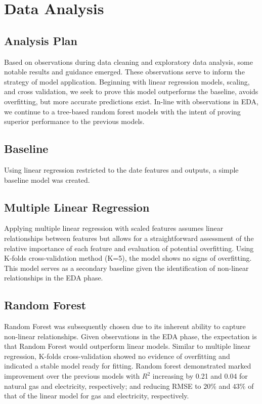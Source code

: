 \documentclass[11pt,a4paper]{article}
\begin{document}
\section{Data Analysis}

\subsection{Analysis Plan}
Based on observations during data cleaning and exploratory data analysis, some notable results and guidance emerged. These observations serve to inform the strategy of model application. Beginning with linear regression models, scaling, and cross validation, we seek to prove this model outperforms the baseline, avoids overfitting, but more accurate predictions exist. In-line with observations in EDA, we continue to a tree-based random forest models with the intent of proving superior performance to the previous models.  

\subsection{Baseline}
Using linear regression restricted to the date features and outputs, a simple baseline model was created.
\subsection{Multiple Linear Regression}
Applying multiple linear regression with scaled features assumes linear relationships between features but allows for a straightforward assessment of the relative importance of each feature and evaluation of potential overfitting. Using K-folds cross-validation method (K=5), the model shows no signs of overfitting. This model serves as a secondary baseline given the identification of non-linear relationships in the EDA phase. 

\subsection{Random Forest}
Random Forest was subsequently chosen due to its inherent ability to capture non-linear relationships. Given observations in the EDA phase, the expectation is that Random Forest would outperform linear models. Similar to multiple linear regression, K-folds cross-validation showed no evidence of overfitting and indicated a stable model ready for fitting. Random forest demonstrated marked improvement over the previous models with $R^2$ increasing by 0.21 and 0.04 for natural gas and electricity, respectively; and reducing RMSE to $20\%$ and $43\%$ of that of the linear model for gas and electricity, respectively.
\end{document}
